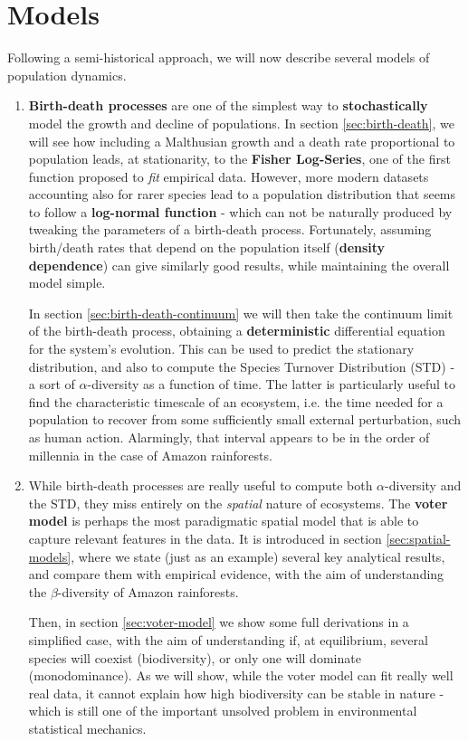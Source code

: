 \documentclass[../../main.tex]{subfiles}
\begin{document}
\section{Models}
Following a semi-historical approach, we will now describe several models of population dynamics.
\begin{enumerate}
    \item \textbf{Birth-death processes} are one of the simplest way to \textbf{stochastically} model the growth and decline of populations. In section \ref{sec:birth-death}, we will see how including a Malthusian growth and a death rate proportional to population leads, at stationarity, to the \textbf{Fisher Log-Series}, one of the first function proposed to \textit{fit} empirical data. However, more modern datasets accounting also for rarer species lead to a population distribution that seems to follow a \textbf{log-normal function} - which can not be naturally produced by tweaking the parameters of a birth-death process. Fortunately, assuming birth/death rates that depend on the population itself (\textbf{density dependence}) can give similarly good results, while maintaining the overall model simple.
    
    \medskip

    In section \ref{sec:birth-death-continuum} we will then take the continuum limit of the birth-death process, obtaining a \textbf{deterministic} differential equation for the system's evolution. This can be used to predict the stationary distribution, and also to compute the Species Turnover Distribution (STD) - a sort of $\alpha$-diversity as a function of time. The latter is particularly useful to find the characteristic timescale of an ecosystem, i.e. the time needed for a population to recover from some sufficiently small external perturbation, such as human action. Alarmingly, that interval appears to be in the order of millennia in the case of Amazon rainforests.
    \item While birth-death processes are really useful to compute both $\alpha$-diversity and the STD, they miss entirely on the \textit{spatial} nature of ecosystems. The \textbf{voter model} is perhaps the most paradigmatic spatial model that is able to capture relevant features in the data. It is introduced in section \ref{sec:spatial-models}, where we state (just as an example) several key analytical results, and compare them with empirical evidence, with the aim of understanding the $\beta$-diversity of Amazon rainforests.
    
    \medskip

    Then, in section \ref{sec:voter-model} we show some full derivations in a simplified case, with the aim of understanding if, at equilibrium, several species will coexist (biodiversity), or only one will dominate (monodominance). As we will show, while the voter model can fit really well real data, it cannot explain how high biodiversity can be stable in nature - which is still one of the important unsolved problem in environmental statistical mechanics.
\end{enumerate}
\end{document}
